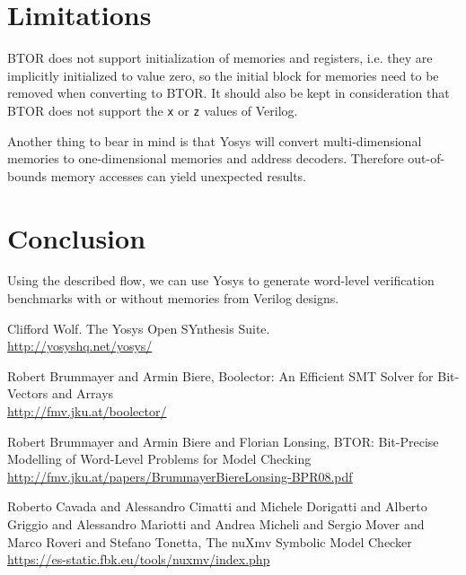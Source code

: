 \documentclass[9pt,technote,a4paper]{IEEEtran}
\begin{document}
\section{Limitations}

BTOR does not support initialization of memories and registers, i.e. they are
implicitly initialized to value zero, so the initial block for
memories need to be removed when converting to BTOR. It should
also be kept in consideration that BTOR does not support the {\tt x} or {\tt z}
values of Verilog.

Another thing to bear in mind is that Yosys will convert multi-dimensional
memories to one-dimensional memories and address decoders. Therefore
out-of-bounds memory accesses can yield unexpected results.

\section{Conclusion}

Using the described flow, we can use Yosys to generate word-level
verification benchmarks with or without memories from Verilog designs.

\begin{thebibliography}{9}

Clifford Wolf. The Yosys Open SYnthesis Suite. \\
\url{http://yosyshq.net/yosys/}

Robert Brummayer and Armin Biere, Boolector: An Efficient SMT Solver for Bit-Vectors and Arrays\\
\url{http://fmv.jku.at/boolector/}

Robert Brummayer and Armin Biere and Florian Lonsing, BTOR:
Bit-Precise Modelling of Word-Level Problems for Model Checking\\
\url{http://fmv.jku.at/papers/BrummayerBiereLonsing-BPR08.pdf}

Roberto Cavada and Alessandro Cimatti and Michele Dorigatti and
Alberto Griggio and Alessandro Mariotti and Andrea Micheli and Sergio
Mover and Marco Roveri and Stefano Tonetta, The nuXmv Symbolic Model
Checker\\
\url{https://es-static.fbk.eu/tools/nuxmv/index.php}

\end{thebibliography}
\end{document}
